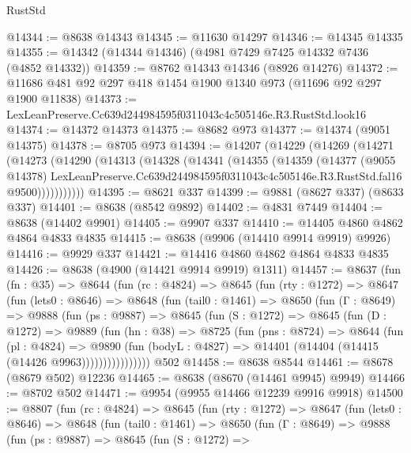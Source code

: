 \begin{lexlean}{RustStd}
\begin{coremodule}
@14344 := @8638 @14343
@14345 := @11630 @14297
@14346 := @14345 @14335
@14355 := @14342 (@14344 @14346) (@4981 @7429 @7425 @14332 @7436 (@4852 @14332))
@14359 := @8762 @14343 @14346 (@8926 @14276)
@14372 := @11686 @481 @92 @297 @418 @1454 @1900 @1340 @973 (@11696 @92 @297 @1900 @11838)
@14373 := LexLeanPreserve.Cc639d244984595f0311043c4c505146e.R3.RustStd.look16
@14374 := @14372 @14373
@14375 := @8682 @973
@14377 := @14374 (@9051 @14375)
@14378 := @8705 @973
@14394 := @14207
    (@14229
      (@14269
        (@14271
          (@14273
            (@14290
              (@14313
                (@14328
                  (@14341
                    (@14355
                      (@14359
                        (@14377
                          (@9055 @14378)
                          LexLeanPreserve.Cc639d244984595f0311043c4c505146e.R3.RustStd.fal16
                          @9500)))))))))))
@14395 := @8621 @337
@14399 := @9881 (@8627 @337) (@8633 @337)
@14401 := @8638 (@8542 @9892)
@14402 := @4831 @7449
@14404 := @8638 (@14402 @9901)
@14405 := @9907 @337
@14410 := @14405 @4860 @4862 @4864 @4833 @4835
@14415 := @8638 (@9906 (@14410 @9914 @9919) @9926)
@14416 := @9929 @337
@14421 := @14416 @4860 @4862 @4864 @4833 @4835
@14426 := @8638 (@4900 (@14421 @9914 @9919) @1311)
@14457 := @8637
    (fun (fn : @35) =>
    @8644
      (fun (rc : @4824) =>
      @8645
        (fun (rty : @1272) =>
        @8647
          (fun (lets0 : @8646) =>
          @8648
            (fun (tail0 : @1461) =>
            @8650
              (fun (Γ : @8649) =>
              @9888
                (fun (ps : @9887) =>
                @8645
                  (fun (S : @1272) =>
                  @8645
                    (fun (D : @1272) =>
                    @9889
                      (fun (hn : @38) =>
                      @8725
                        (fun (pns : @8724) =>
                        @8644
                          (fun (pl : @4824) =>
                          @9890
                            (fun (bodyL : @4827) =>
                            @14401 (@14404 (@14415 (@14426 @9963))))))))))))))))
    @502
@14458 := @8638 @8544
@14461 := @8678 (@8679 @502) @12236
@14465 := @8638 (@8670 (@14461 @9945) @9949)
@14466 := @8702 @502
@14471 := @9954 (@9955 @14466 @12239 @9916 @9918)
@14500 := @8807
    (fun (rc : @4824) =>
    @8645
      (fun (rty : @1272) =>
      @8647
        (fun (lets0 : @8646) =>
        @8648
          (fun (tail0 : @1461) =>
          @8650
            (fun (Γ : @8649) =>
            @9888
              (fun (ps : @9887) =>
              @8645
                (fun (S : @1272) =>

\end{coremodule}
\end{lexlean}
